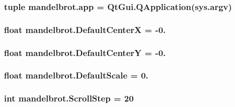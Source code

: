 \subsubsection[{app}]{\setlength{\rightskip}{0pt plus 5cm}tuple mandelbrot.\+app = Qt\+Gui.\+Q\+Application(sys.\+argv)}\label{namespacemandelbrot_a6b7d890dd704569ef3c20abbe050fa9a}
\hypertarget{namespacemandelbrot_a3ebdfc03dbff72dc26a6e6c83852d37b}{}
\subsubsection[{Default\+Center\+X}]{\setlength{\rightskip}{0pt plus 5cm}float mandelbrot.\+Default\+Center\+X = -\/0.}\label{namespacemandelbrot_a3ebdfc03dbff72dc26a6e6c83852d37b}
\hypertarget{namespacemandelbrot_a29d5e85ee2e76fa638f1023b4740fe67}{}
\subsubsection[{Default\+Center\+Y}]{\setlength{\rightskip}{0pt plus 5cm}float mandelbrot.\+Default\+Center\+Y = -\/0.}\label{namespacemandelbrot_a29d5e85ee2e76fa638f1023b4740fe67}
\hypertarget{namespacemandelbrot_aef2770aab4cfc4659eb64513c439f7b2}{}
\subsubsection[{Default\+Scale}]{\setlength{\rightskip}{0pt plus 5cm}float mandelbrot.\+Default\+Scale = 0.}\label{namespacemandelbrot_aef2770aab4cfc4659eb64513c439f7b2}
\hypertarget{namespacemandelbrot_a76279f2762696c39797b1b526a95b699}{}
\subsubsection[{Scroll\+Step}]{\setlength{\rightskip}{0pt plus 5cm}int mandelbrot.\+Scroll\+Step = 20}\label{namespacemandelbrot_a76279f2762696c39797b1b526a95b699}
\hypertarget{namespacemandelbrot_af1a0634cd8b41b6157f406a73b59b99c}{}
